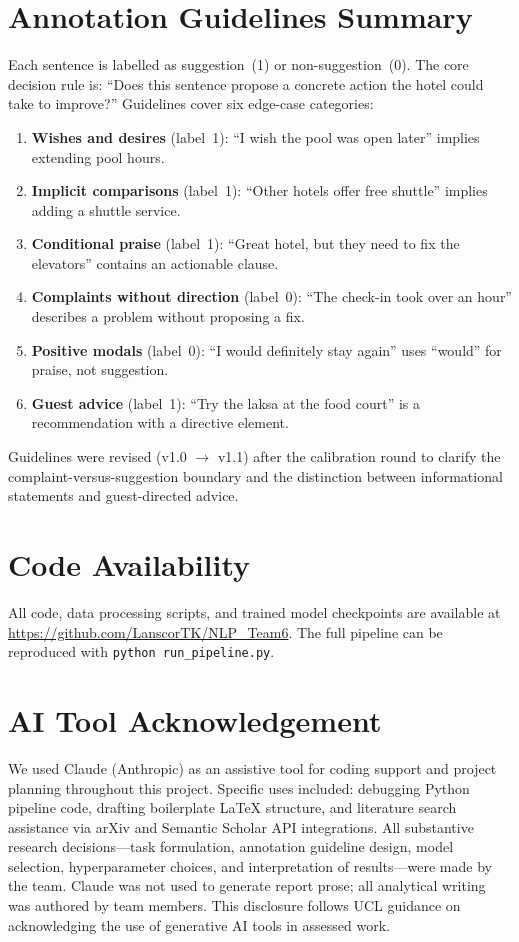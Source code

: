 \section{Annotation Guidelines Summary}
\label{app:guidelines}

Each sentence is labelled as suggestion~(1) or
non-suggestion~(0). The core decision rule is: ``Does this
sentence propose a concrete action the hotel could take to
improve?'' Guidelines cover six edge-case categories:

\begin{enumerate}
  \item \textbf{Wishes and desires} (label~1): ``I wish the pool
  was open later'' implies extending pool hours.
  \item \textbf{Implicit comparisons} (label~1): ``Other hotels
  offer free shuttle'' implies adding a shuttle service.
  \item \textbf{Conditional praise} (label~1): ``Great hotel, but
  they need to fix the elevators'' contains an actionable clause.
  \item \textbf{Complaints without direction} (label~0): ``The
  check-in took over an hour'' describes a problem without
  proposing a fix.
  \item \textbf{Positive modals} (label~0): ``I would definitely
  stay again'' uses ``would'' for praise, not suggestion.
  \item \textbf{Guest advice} (label~1): ``Try the laksa at the
  food court'' is a recommendation with a directive element.
\end{enumerate}

Guidelines were revised (v1.0 $\rightarrow$ v1.1) after the
calibration round to clarify the complaint-versus-suggestion
boundary and the distinction between informational statements
and guest-directed advice.

\section{Code Availability}
\label{app:code}

All code, data processing scripts, and trained model checkpoints
are available at
\url{https://github.com/LanscorTK/NLP_Team6}. The full
pipeline can be reproduced with
\texttt{python run\_pipeline.py}.

\section{AI Tool Acknowledgement}
\label{app:ai}

We used Claude (Anthropic) as an assistive tool for coding
support and project planning throughout this project. Specific
uses included: debugging Python pipeline code, drafting
boilerplate LaTeX structure, and literature search assistance
via arXiv and Semantic Scholar API integrations. All substantive
research decisions---task formulation, annotation guideline
design, model selection, hyperparameter choices, and
interpretation of results---were made by the team. Claude was
not used to generate report prose; all analytical writing was
authored by team members. This disclosure follows UCL guidance
on acknowledging the use of generative AI tools in assessed
work.
